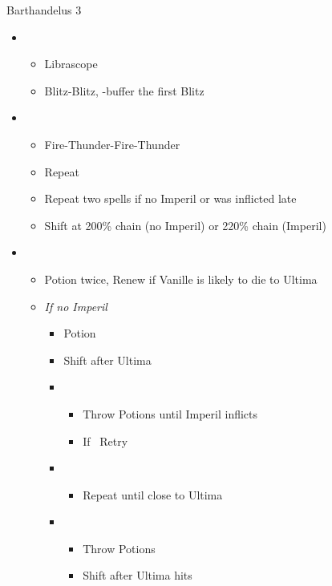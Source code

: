 \begin{battle}[1:26]{Barthandelus 3}
		\begin{itemize}
			\item \second
			      \begin{itemize}
				      \item Librascope
				      \item Blitz-Blitz, \rav-buffer the first Blitz
			      \end{itemize}
			\item \fifth
			      \begin{itemize}
				      \item Fire-Thunder-Fire-Thunder
				      \item Repeat
				      \item Repeat two spells if no Imperil or was inflicted late
				      \item Shift at 200\% chain (no Imperil) or 220\% chain (Imperil)
			      \end{itemize}
			\item \third
			      \begin{itemize}
				      \item Potion twice, Renew if Vanille is likely to die to Ultima
				      \item \textit{If no Imperil}
				            \begin{itemize}
					            \item Potion
					            \item Shift after Ultima
					            \item \fifth
					                  \begin{itemize}
						                  \item Throw Potions until Imperil inflicts
						                  \item If \stagger\ Retry
					                  \end{itemize}
					            \item \fourth
					                  \begin{itemize}
						                  \item Repeat until close to Ultima
					                  \end{itemize}
					            \item \third
					                  \begin{itemize}
						                  \item Throw Potions
						                  \item Shift after Ultima hits

\end{itemize}
\end{itemize}
\end{itemize}
\end{itemize}
\end{battle}

